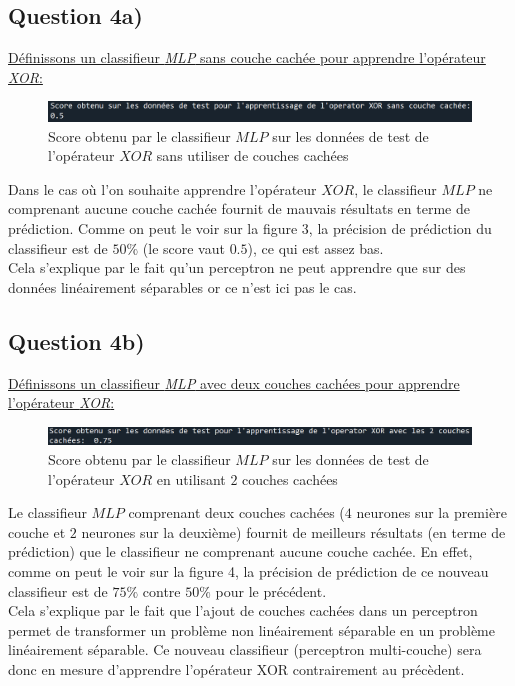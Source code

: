 \documentclass[a4paper,french,10pt]{article}
\begin{document}
	\subsection{Question 4a)}
	
	\underline{Définissons un classifieur \textit{MLP} sans couche cachée pour apprendre l’opérateur \textit{XOR}:}
	
	
	
	\begin{figure}[H]
		\centering
		\includegraphics[scale=0.7]{images/Q4a.png}
		\caption{Score obtenu par le classifieur $MLP$ sur les données de test de l'opérateur $XOR$ sans utiliser de couches cachées}
	\end{figure}
	Dans le cas où l'on souhaite apprendre l'opérateur $XOR$, le classifieur $MLP$ ne comprenant aucune couche cachée fournit de mauvais résultats en terme de prédiction. Comme on peut le voir sur la figure 3, la précision de prédiction du classifieur est de $50\%$ (le score vaut $0.5$), ce qui est assez bas.\\
	Cela s'explique par le fait qu'un perceptron ne peut apprendre que sur des données linéairement séparables or ce n'est ici pas le cas.
	
	\subsection{Question 4b)}
	
	\underline{Définissons un classifieur \textit{MLP} avec deux couches cachées pour apprendre l’opérateur \textit{XOR}:}
	
	
	
	\begin{figure}[H]
		\centering
		\includegraphics[scale=0.7]{images/Q4b.png}
		\caption{Score obtenu par le classifieur $MLP$ sur les données de test de l'opérateur $XOR$ en utilisant $2$ couches cachées}
	\end{figure}
	Le classifieur $MLP$ comprenant deux couches cachées ($4$ neurones sur la première couche et $2$ neurones sur la deuxième) fournit de meilleurs résultats (en terme de prédiction) que le classifieur ne comprenant aucune couche cachée. En effet, comme on peut le voir sur la figure 4, la précision de prédiction de ce nouveau classifieur est de $75\%$ contre $50\%$ pour le précédent.\\
	Cela s'explique par le fait que l'ajout de couches cachées dans un perceptron permet de transformer un problème non linéairement séparable en un problème linéairement séparable. Ce nouveau classifieur (perceptron multi-couche) sera donc en mesure d'apprendre l'opérateur XOR contrairement au précèdent.
	
\end{document}

